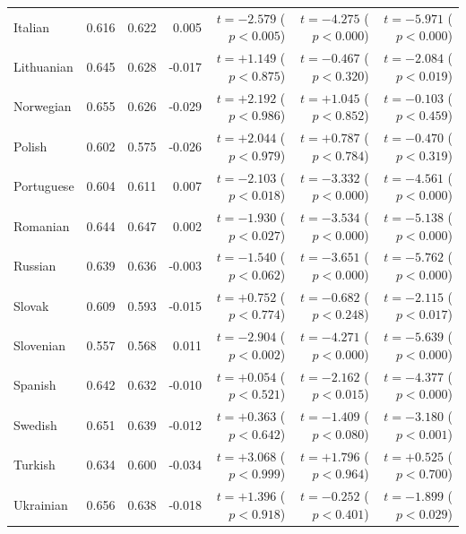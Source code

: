 \begin{longtable}[t]{lrrrrrr}
Italian & 0.616 & 0.622 & 0.005 & $t=-2.579$ ($p < 0.005$) & $t=-4.275$ ($p < 0.000$) & $t=-5.971$ ($p < 0.000$)\\
Lithuanian & 0.645 & 0.628 & -0.017 & $t=+1.149$ ($p < 0.875$) & $t=-0.467$ ($p < 0.320$) & $t=-2.084$ ($p < 0.019$)\\
Norwegian & 0.655 & 0.626 & -0.029 & $t=+2.192$ ($p < 0.986$) & $t=+1.045$ ($p < 0.852$) & $t=-0.103$ ($p < 0.459$)\\
Polish & 0.602 & 0.575 & -0.026 & $t=+2.044$ ($p < 0.979$) & $t=+0.787$ ($p < 0.784$) & $t=-0.470$ ($p < 0.319$)\\
Portuguese & 0.604 & 0.611 & 0.007 & $t=-2.103$ ($p < 0.018$) & $t=-3.332$ ($p < 0.000$) & $t=-4.561$ ($p < 0.000$)\\
Romanian & 0.644 & 0.647 & 0.002 & $t=-1.930$ ($p < 0.027$) & $t=-3.534$ ($p < 0.000$) & $t=-5.138$ ($p < 0.000$)\\
Russian & 0.639 & 0.636 & -0.003 & $t=-1.540$ ($p < 0.062$) & $t=-3.651$ ($p < 0.000$) & $t=-5.762$ ($p < 0.000$)\\
Slovak & 0.609 & 0.593 & -0.015 & $t=+0.752$ ($p < 0.774$) & $t=-0.682$ ($p < 0.248$) & $t=-2.115$ ($p < 0.017$)\\
Slovenian & 0.557 & 0.568 & 0.011 & $t=-2.904$ ($p < 0.002$) & $t=-4.271$ ($p < 0.000$) & $t=-5.639$ ($p < 0.000$)\\
Spanish & 0.642 & 0.632 & -0.010 & $t=+0.054$ ($p < 0.521$) & $t=-2.162$ ($p < 0.015$) & $t=-4.377$ ($p < 0.000$)\\
Swedish & 0.651 & 0.639 & -0.012 & $t=+0.363$ ($p < 0.642$) & $t=-1.409$ ($p < 0.080$) & $t=-3.180$ ($p < 0.001$)\\
Turkish & 0.634 & 0.600 & -0.034 & $t=+3.068$ ($p < 0.999$) & $t=+1.796$ ($p < 0.964$) & $t=+0.525$ ($p < 0.700$)\\
Ukrainian & 0.656 & 0.638 & -0.018 & $t=+1.396$ ($p < 0.918$) & $t=-0.252$ ($p < 0.401$) & $t=-1.899$ ($p < 0.029$)\\
\bottomrule
\end{longtable}
\endgroup{}
